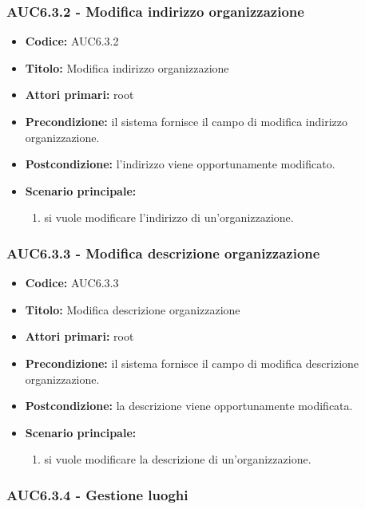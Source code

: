 \documentclass[casi-duso]{subfiles}
\begin{document}
\subsubsection{AUC6.3.2 - Modifica indirizzo organizzazione}%
\label{subsub:AUC6.3.2}
\begin{itemize}
  \item \textbf{Codice:} AUC6.3.2
  \item \textbf{Titolo:} Modifica indirizzo organizzazione
  \item \textbf{Attori primari:} root
  \item \textbf{Precondizione:} il sistema fornisce il campo di modifica indirizzo organizzazione.
  \item \textbf{Postcondizione:} l'indirizzo viene opportunamente modificato.
  \item \textbf{Scenario principale:}
  \begin{enumerate}
    \item si vuole modificare l'indirizzo di un'organizzazione.
  \end{enumerate}
\end{itemize}

\subsubsection{AUC6.3.3 - Modifica descrizione organizzazione}%
\label{subsub:AUC6.3.3}
\begin{itemize}
  \item \textbf{Codice:} AUC6.3.3
  \item \textbf{Titolo:} Modifica descrizione organizzazione
  \item \textbf{Attori primari:} root
  \item \textbf{Precondizione:} il sistema fornisce il campo di modifica descrizione organizzazione.
  \item \textbf{Postcondizione:} la descrizione viene opportunamente modificata.
  \item \textbf{Scenario principale:}
  \begin{enumerate}
    \item si vuole modificare la descrizione di un'organizzazione.
  \end{enumerate}
\end{itemize}

\subsubsection{AUC6.3.4 - Gestione luoghi}%
\label{subsub:AUC6.3.4}
\end{document}
